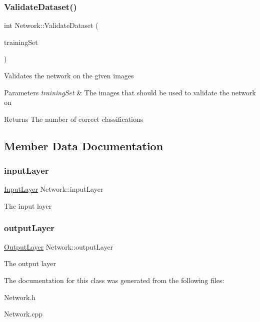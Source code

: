 \subsubsection{\texorpdfstring{Validate\+Dataset()}{ValidateDataset()}}
{\footnotesize\ttfamily int Network\+::\+Validate\+Dataset (\begin{DoxyParamCaption}\item[{vector$<$ pair$<$ array$<$ unsigned char, \mbox{\hyperlink{_constants_8h_aefc2426e4681da445c7793c98a83c532}{N\+E\+U\+R\+O\+N\+S\+\_\+\+IN}} $>$, unsigned char $>$$>$ \&}]{training\+Set }\end{DoxyParamCaption})}

Validates the network on the given images 
\begin{DoxyParams}{Parameters}
{\em training\+Set} & The images that should be used to validate the network on \\
\hline
\end{DoxyParams}
\begin{DoxyReturn}{Returns}
The number of correct classifications 
\end{DoxyReturn}


\subsection{Member Data Documentation}
\mbox{\label{class_network_a09e2b3de83ec93b35349e4c72fabed65}} 
\subsubsection{\texorpdfstring{input\+Layer}{inputLayer}}
{\footnotesize\ttfamily \mbox{\hyperlink{class_input_layer}{Input\+Layer}} Network\+::input\+Layer\hspace{0.3cm}{\ttfamily [protected]}}

The input layer \mbox{\label{class_network_adc5fb83d4660e4ab6b15e93ae1c4ef44}} 
\subsubsection{\texorpdfstring{output\+Layer}{outputLayer}}
{\footnotesize\ttfamily \mbox{\hyperlink{class_output_layer}{Output\+Layer}} Network\+::output\+Layer\hspace{0.3cm}{\ttfamily [protected]}}

The output layer 

The documentation for this class was generated from the following files\+:\begin{DoxyCompactItemize}
\item 
Network.\+h\item 
Network.\+cpp\end{DoxyCompactItemize}
